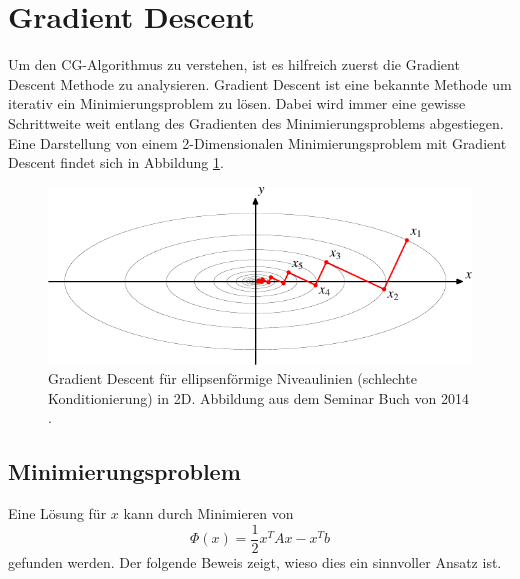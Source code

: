 %
%
%
\section{Gradient Descent\label{cg:section:steepest_descent}}

Um den CG-Algorithmus zu verstehen, ist es hilfreich zuerst die Gradient Descent Methode zu analysieren.
Gradient Descent ist eine bekannte Methode um iterativ ein Minimierungsproblem zu lösen.
Dabei wird immer eine gewisse Schrittweite weit entlang des Gradienten des Minimierungsproblems abgestiegen.
Eine Darstellung von einem 2-Dimensionalen Minimierungsproblem mit Gradient Descent findet sich in Abbildung \ref{cg:abb:steepest_descent}.

\begin{figure}	
	\centering
	\includegraphics{papers/cg/images/descent-1}
	\caption{Gradient Descent für ellipsenförmige Niveaulinien (schlechte Konditionierung) in 2D. 
		Abbildung aus dem Seminar Buch von 2014 \cite{cg:book:hpc}.}
	\label{cg:abb:steepest_descent}
\end{figure}

\subsection{Minimierungsproblem \label{cg:subsection:Minimierungsproblem}}

Eine Lösung für $x$ kann durch Minimieren von
\begin{equation}
\Phi(x) = \frac{1}{2} x^T A x - x^T b
\end{equation}
gefunden werden.
Der folgende Beweis zeigt, wieso dies ein sinnvoller Ansatz ist.

